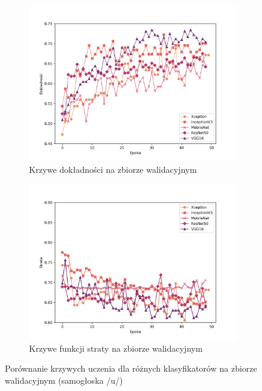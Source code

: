 \begin{figure}[ht]
    \centering
    \begin{subfigure}{0.49\textwidth}
        \centering
        \includegraphics[width=\textwidth]{./img/results/u_acc}
        \caption{Krzywe dokładności na zbiorze walidacyjnym\@}
        \label{fig:u_acc}
    \end{subfigure}
    \begin{subfigure}{0.49\textwidth}
        \centering
        \includegraphics[width=\textwidth]{./img/results/u_loss}
        \caption{Krzywe funkcji straty na zbiorze walidacyjnym\@}
        \label{fig:u_loss}
    \end{subfigure}

    \caption{Porównanie krzywych uczenia dla różnych klasyfikatorów na zbiorze walidacyjnym (samogłoska /u/)}
    \label{fig:u_results}
\end{figure}

